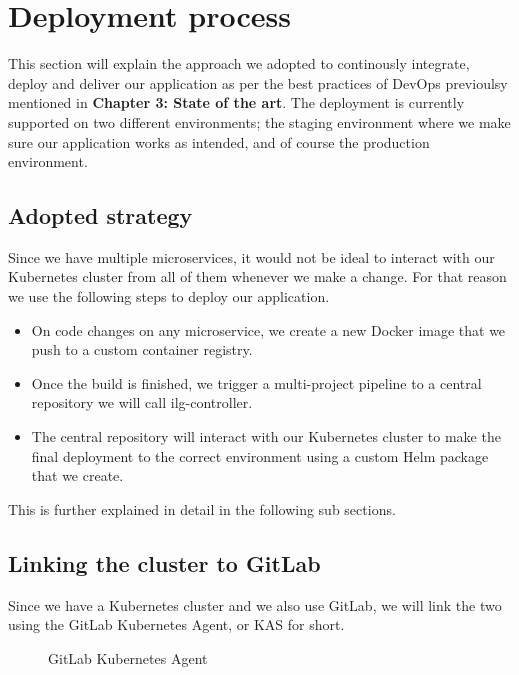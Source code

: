 \section{Deployment process}
This section will explain the approach we adopted to continously integrate, deploy and deliver our application as per the best practices of DevOps previoulsy mentioned in \textbf{Chapter 3: State of the art}.
The deployment is currently supported on two different environments; the staging environment where we make sure our application works as intended, and of course the production environment.

\subsection{Adopted strategy}
Since we have multiple microservices, it would not be ideal to interact with our Kubernetes cluster from all of them whenever we make a change.
For that reason we use the following steps to deploy our application.
\begin{itemize}
    \item On code changes on any microservice, we create a new Docker image that we push to a custom container registry.
    \item Once the build is finished, we trigger a multi-project pipeline to a central repository we will call ilg-controller.
    \item The central repository will interact with our Kubernetes cluster to make the final deployment to the correct environment using a custom Helm package that we create.
\end{itemize}

This is further explained in detail in the following sub sections.

\subsection{Linking the cluster to GitLab}
Since we have a Kubernetes cluster and we also use GitLab, we will link the two using the GitLab Kubernetes Agent, or KAS for short.

\begin{figure}[H]
    \centering
    \caption{GitLab Kubernetes Agent}
    \label{fig:gitlab-kubernetes-agent}
\end{figure}

